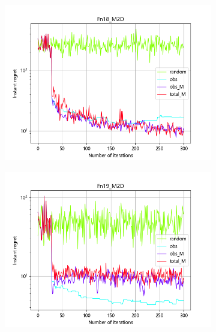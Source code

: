 \documentclass{article}
\begin{document}
\begin{figure}[H]
\begin{subfigure}[t]{.32\linewidth}
        \includegraphics[width=1\textwidth]{pictures/Homo_noise_2D/M/Fn18_M2D_ins.png}
    \end{subfigure}
    \begin{subfigure}[t]{.32\linewidth}
        \centering
        \includegraphics[width=1\textwidth]{pictures/Homo_noise_2D/M/Fn19_M2D_ins.png}
    \end{subfigure}
    \begin{subfigure}[t]{.32\linewidth}
        \centering

\end{subfigure}
\end{figure}
\end{document}
